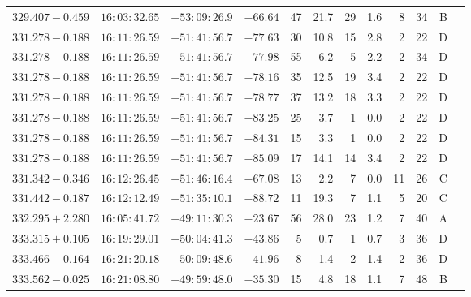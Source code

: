 {\begin{longtable}{c rrr rrrrr rr c}
    $329.407-0.459$     &   $16:03:32.65$     &   $-53:09:26.9$     &   $-66.64  $    &   47     &   21.7    &    29  &   1.6 &   8   &   34  &   B   \\
    $331.278-0.188$     &   $16:11:26.59$     &   $-51:41:56.7$     &   $-77.63  $    &   30     &   10.8    &    15  &   2.8 &   2   &   22  &   D   \\
    $331.278-0.188$     &   $16:11:26.59$     &   $-51:41:56.7$     &   $-77.98  $    &   55     &    6.2    &    5   &   2.2 &   2   &   34  &   D   \\
    $331.278-0.188$     &   $16:11:26.59$     &   $-51:41:56.7$     &   $-78.16  $    &   35     &   12.5    &    19  &   3.4 &   2   &   22  &   D   \\
    $331.278-0.188$     &   $16:11:26.59$     &   $-51:41:56.7$     &   $-78.77  $    &   37     &   13.2    &    18  &   3.3 &   2   &   22  &   D   \\
    $331.278-0.188$     &   $16:11:26.59$     &   $-51:41:56.7$     &   $-83.25  $    &   25     &    3.7    &    1   &   0.0 &   2   &   22  &   D   \\
    $331.278-0.188$     &   $16:11:26.59$     &   $-51:41:56.7$     &   $-84.31  $    &   15     &    3.3    &    1   &   0.0 &   2   &   22  &   D   \\
    $331.278-0.188$     &   $16:11:26.59$     &   $-51:41:56.7$     &   $-85.09  $    &   17     &   14.1    &    14  &   3.4 &   2   &   22  &   D   \\
    $331.342-0.346$     &   $16:12:26.45$     &   $-51:46:16.4$     &   $-67.08  $    &   13     &    2.2    &    7   &   0.0 &   11  &   26  &   C   \\
    $331.442-0.187$     &   $16:12:12.49$     &   $-51:35:10.1$     &   $-88.72  $    &   11     &   19.3    &    7   &   1.1 &   5   &   20  &   C   \\
    $332.295+2.280$     &   $16:05:41.72$     &   $-49:11:30.3$     &   $-23.67  $    &   56     &   28.0    &    23  &   1.2 &   7   &   40  &   A   \\
    $333.315+0.105$     &   $16:19:29.01$     &   $-50:04:41.3$     &   $-43.86  $    &   5      &    0.7    &    1   &   0.7 &   3   &   36  &   D   \\
    $333.466-0.164$     &   $16:21:20.18$     &   $-50:09:48.6$     &   $-41.96  $    &   8      &    1.4    &    2   &   1.4 &   2   &   36  &   D   \\
    $333.562-0.025$     &   $16:21:08.80$     &   $-49:59:48.0$     &   $-35.30  $    &   15     &    4.8    &    18  &   1.1 &   7   &   48  &   B   \\

\end{longtable}}
